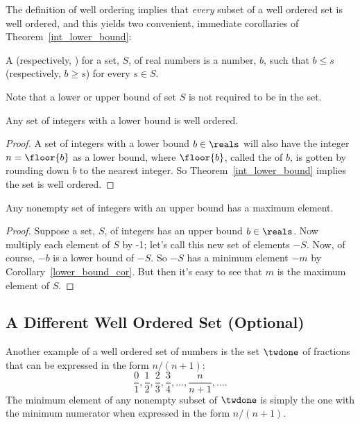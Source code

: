 The definition of well ordering implies that \emph{every} subset of a
well ordered set is well ordered, and this yields two convenient,
immediate corollaries of Theorem~\ref{int_lower_bound}:

\begin{definition}
A  (respectively, ) for a set,
$S$, of real numbers is a number, $b$, such that $b \leq s$
(respectively, $b \geq s$) for every $s \in S$.
\end{definition}
Note that a lower or upper bound of set $S$ is not required to be in
the set.

\begin{corollary}\label{lower_bound_cor}
Any set of integers with a lower bound is well ordered.
\end{corollary}

\begin{proof}
A set of integers with a lower bound $b \in \reals$ will also have the
integer $n = \floor{b}$ as a lower bound, where $\floor{b}$, called
the  of $b$, is gotten by rounding down $b$ to the nearest
integer.  So Theorem~\ref{int_lower_bound} implies the set is well
ordered.
\end{proof}


\begin{corollary}\label{upper_bound_cor}
Any nonempty set of integers with an upper bound has a maximum
element.
\end{corollary}

\begin{proof}
Suppose a set, $S$, of integers has an upper bound $b \in \reals$.
Now multiply each element of $S$ by -1; let's call this new set of
elements $-S$.  Now, of course, $-b$ is a lower bound of $-S$.  So
$-S$ has a minimum element $-m$ by Corollary~\ref{lower_bound_cor}.
But then it's easy to see that $m$ is the maximum element of $S$.
\end{proof}


\subsection{A Different Well Ordered Set (Optional)}\label{twdone_sec}

Another example of a well ordered set of numbers is the set $\twdone$ of
fractions that can be expressed in the form $n/(n+1)$:
\[
\frac01, \frac12, \frac23, \frac34, \dots, \frac{n}{n+1}, \dots.
\]
The minimum element of any nonempty subset of $\twdone$ is simply the one
with the minimum numerator when expressed in the form $n/(n+1)$. 

